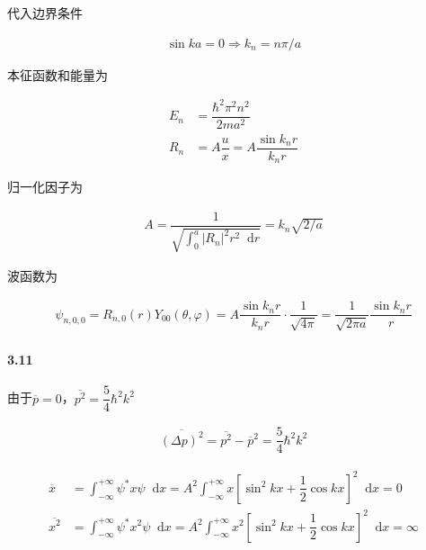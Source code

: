 \documentclass{article}
\newcommand*{\md}{\mathop{}\!\mathrm{d}}
\begin{document}
代入边界条件

\begin{equation*}
  \begin{aligned}
    \sin ka = 0
    \Rightarrow
    k_n  = n\pi /a
  \end{aligned}
\end{equation*}

本征函数和能量为

\begin{equation*}
  \begin{aligned}
    E_n &= \dfrac{\hbar^2 \pi^2 n^2}{2ma^2} \\
    R_n &= A \dfrac{u}{x} = A \dfrac{\sin k_nr}{k_n r}  
  \end{aligned}
\end{equation*}

归一化因子为

\begin{equation*}
  \begin{aligned}
    A = \dfrac{1}{\sqrt{\int_0^a \left| R_n \right|^2 r^2 \md r}}
    = k_n \sqrt{2/a}
  \end{aligned}
\end{equation*}

波函数为

\begin{equation*}
  \begin{aligned}
    \psi_{n,0,0} = R_{n,0} \left( r \right) Y_{00} \left( \theta, \varphi \right)
    = A \dfrac{\sin k_n r}{k_n r} \cdot \dfrac{1}{\sqrt{4\pi}}
    = \dfrac{1}{\sqrt{2\pi a}} \dfrac{\sin k_n r}{r}  
  \end{aligned}
\end{equation*}

\paragraph{3.11}

由于$\overline{p}=0$，$\overline{p^2}=\dfrac{5}{4} \hbar^2 k^2 $

\begin{equation*}
  \begin{aligned}
    \overline{\left( \Delta p \right)^2} = \overline{p^2} - \overline{p}^2 = \dfrac{5}{4} \hbar^2 k^2 
  \end{aligned}
\end{equation*}

\begin{equation*}
  \begin{aligned}
    \overline{x} &= \int_{-\infty}^{+\infty} \psi^{*} x \psi \md x = A^2 \int_{-\infty}^{+\infty} x \left[ \sin^2 kx + \dfrac{1}{2} \cos kx  \right]^2 \md x = 0 \\
    \overline{x^2} &= \int_{-\infty}^{+\infty} \psi^{*} x^2 \psi \md x = A^2 \int_{-\infty}^{+\infty} x^2 \left[ \sin^2 kx + \dfrac{1}{2} \cos kx  \right]^2 \md x = \infty \\
  \end{aligned}
\end{equation*}
\end{document}
